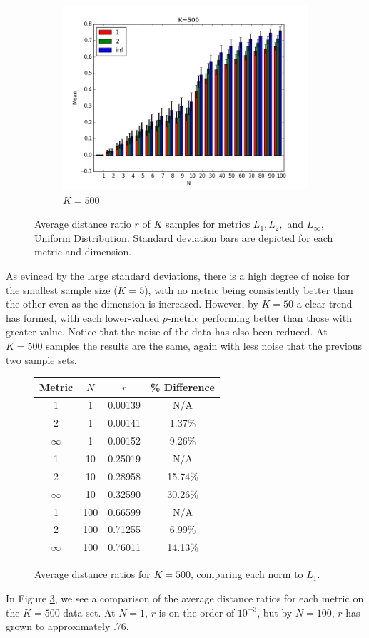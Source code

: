 \documentclass{article}
\begin{document}
\begin{figure}[H]
   \centering
   \ContinuedFloat 
    \begin{subfigure}[h]{0.9\textwidth}
        \includegraphics[width=\textwidth]{l-experiment1-1-500-inf.png}
        \caption{$K=500$}
        \label{fig:exp11k500}
    \end{subfigure}
    \caption{Average distance ratio $r$ of $K$ samples for metrics $L_1,L_2,$ and $L_{\infty}$, Uniform Distribution. Standard deviation bars are depicted for each metric and dimension.}\label{fig:exp11}
\end{figure}
As evinced by the large standard deviations, there is a high degree of noise for the smallest sample size ($K=5$),  with no metric being consistently better than the other even as the dimension is increased. However, by $K=50$ a clear trend has formed, with each lower-valued $p$-metric performing better than those with greater value. Notice that the noise of the data has also been reduced. At $K=500$ samples the results are the same, again with less noise that the previous two sample sets.
\
\begin{figure}[H]
\centering
\begin{tabular}{|c|c|c|c|}
\hline
Metric & $N$ & $r$ & \% Difference\\
\hline
1 & 1 & 0.00139 & N/A\\
2 & 1 & 0.00141 & 1.37\%\\
$\infty$ & 1 & 0.00152 & 9.26\%\\
\hline
1 & 10 & 0.25019 & N/A\\
2 & 10 & 0.28958 & 15.74\%\\
$\infty$ & 10 & 0.32590 & 30.26\%\\
\hline
1 & 100 & 0.66599 & N/A\\
2 & 100 & 0.71255 & 6.99\%\\
$\infty$ & 100 & 0.76011 & 14.13\%\\
\hline
\end{tabular}
\caption{Average distance ratios for $K=500$, comparing each norm to $L_1$.}
\label{fig:exp11data}
\end{figure}
In Figure \ref{fig:exp11data}, we see a comparison of the average distance ratios for each metric on the $K=500$ data set. At $N=1$, $r$ is on the order of $10^{-3}$, but by $N=100$, $r$ has grown to approximately .76.
\end{document}
